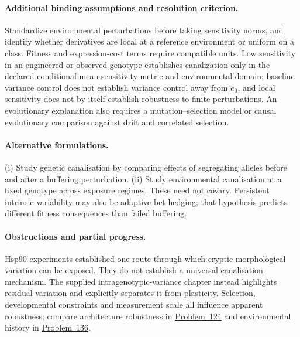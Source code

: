 \documentclass[11pt]{article}
\begin{document}
\paragraph{Additional binding assumptions and resolution criterion.} Standardize environmental perturbations before taking sensitivity norms, and identify whether derivatives are local at a reference environment or uniform on a class. Fitness and expression-cost terms require compatible units. Low sensitivity in an engineered or observed genotype establishes canalization only in the declared conditional-mean sensitivity metric and environmental domain; baseline variance control does not establish variance control away from $e_0$, and local sensitivity does not by itself establish robustness to finite perturbations. An evolutionary explanation also requires a mutation--selection model or causal evolutionary comparison against drift and correlated selection.

\paragraph{Alternative formulations.} (i) Study genetic canalisation by comparing effects of segregating alleles before and after a buffering perturbation. (ii) Study environmental canalisation at a fixed genotype across exposure regimes. These need not covary. Persistent intrinsic variability may also be adaptive bet-hedging; that hypothesis predicts different fitness consequences than failed buffering.
\paragraph{Obstructions and partial progress.} Hsp90 experiments established one route through which cryptic morphological variation can be exposed. They do not establish a universal canalisation mechanism. The supplied intragenotypic-variance chapter instead highlights residual variation and explicitly separates it from plasticity. Selection, developmental constraints and measurement scale all influence apparent robustness; compare architecture robustness in \href{https://we-solve.github.io/problems/patterning-robustness-59dbcc72/}{Problem~124} and environmental history in \href{https://we-solve.github.io/problems/developmental-plasticity-5728339d/}{Problem~136}.
\end{document}
